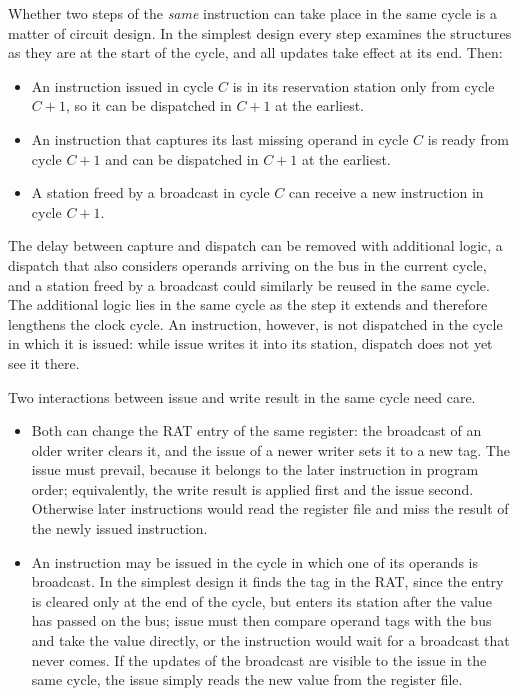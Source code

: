 \documentclass[../main.tex]{subfiles}
\begin{document}
Whether two steps of the \emph{same} instruction can take place in the same
cycle is a matter of circuit design.  In the simplest design every step
examines the structures as they are at the start of the cycle, and all
updates take effect at its end.  Then:
\begin{itemize}
  \item An instruction issued in cycle $C$ is in its reservation station only
    from cycle $C+1$, so it can be dispatched in $C+1$ at the earliest.
  \item An instruction that captures its last missing operand in cycle $C$ is
    ready from cycle $C+1$ and can be dispatched in $C+1$ at the earliest.
  \item A station freed by a broadcast in cycle $C$ can receive a new
    instruction in cycle $C+1$.
\end{itemize}
The delay between capture and dispatch can be removed with additional logic,
a dispatch that also considers operands arriving on the bus in the current
cycle, and a station freed by a broadcast could similarly be reused in the
same cycle.  The additional logic lies in the same cycle as the step it
extends and therefore lengthens the clock cycle.  An instruction, however, is
not dispatched in the cycle in which it is issued: while issue writes it into
its station, dispatch does not yet see it there.

Two interactions between issue and write result in the same cycle need care.
\begin{itemize}
  \item Both can change the RAT entry of the same register: the broadcast of
    an older writer clears it, and the issue of a newer writer sets it to a
    new tag.  The issue must prevail, because it belongs to the later
    instruction in program order; equivalently, the write result is applied
    first and the issue second.  Otherwise later instructions would read the
    register file and miss the result of the newly issued instruction.
  \item An instruction may be issued in the cycle in which one of its operands
    is broadcast.  In the simplest design it finds the tag in the RAT, since
    the entry is cleared only at the end of the cycle, but enters its station
    after the value has passed on the bus; issue must then compare operand
    tags with the bus and take the value directly, or the instruction would
    wait for a broadcast that never comes.  If the updates of the broadcast
    are visible to the issue in the same cycle, the issue simply reads the
    new value from the register file.
\end{itemize}
\end{document}
